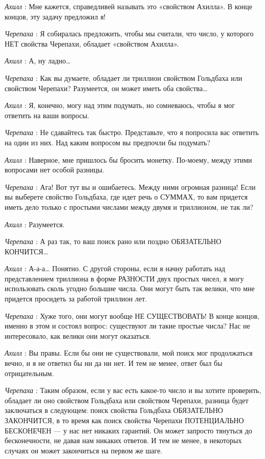 \documentclass[../main.tex]{subfiles}
\begin{document}
\begin{dialogue}
\emph{Ахилл} : Мне кажется, справедливей называть это «свойством Ахилла». В конце концов, эту задачу предложил я!

\emph{Черепаха} : Я собиралась предложить, чтобы мы считали, что число, у которого НЕТ свойства Черепахи, обладает «свойством Ахилла».

\emph{Ахилл} : А, ну ладно\ldots{}

\emph{Черепаха} : Как вы думаете, обладает ли триллион свойством Гольдбаха или свойством Черепахи? Разумеется, он может иметь оба свойства\ldots{}

\emph{Ахилл} : Я, конечно, могу над этим подумать, но сомневаюсь, чтобы я мог ответить на ваши вопросы.

\emph{Черепаха} : Не сдавайтесь так быстро. Представьте, что я попросила вас ответить на один из них. Над каким вопросом вы предпочли бы подумать?

\emph{Ахилл} : Наверное, мне пришлось бы бросить монетку. По-моему, между этими вопросами нет особой разницы.

\emph{Черепаха} : Ага! Вот тут вы и ошибаетесь. Между ними огромная разница! Если вы выберете свойство Гольдбаха, где идет речь о СУММАХ, то вам придется иметь дело только с простыми числами между двумя и триллионом, не так ли?

\emph{Ахилл} : Разумеется.

\emph{Черепаха} : А раз так, то ваш поиск рано или поздно ОБЯЗАТЕЛЬНО КОНЧИТСЯ\ldots{}

\emph{Ахилл} : А-а-а\ldots{} Понятно. С другой стороны, если я начну работать над представлением триллиона в форме РАЗНОСТИ двух простых чисел, я могу использовать сколь угодно большие числа. Они могут быть так велики, что мне придется просидеть за работой триллион лет.

\emph{Черепаха} : Хуже того, они могут вообще НЕ СУЩЕСТВОВАТЬ! В конце концов, именно в этом и состоял вопрос: существуют ли такие простые числа? Нас не интересовало, как велики они могут оказаться.

\emph{Ахилл} : Вы правы. Если бы они не существовали, мой поиск мог продолжаться вечно, и я не ответил бы ни да ни нет. И тем не менее, ответ был бы отрицательным.

\emph{Черепаха} : Таким образом, если у вас есть какое-то число и вы хотите проверить, обладает ли оно свойством Гольдбаха или свойством Черепахи, разница будет заключаться в следующем: поиск свойства Гольдбаха ОБЯЗАТЕЛЬНО ЗАКОНЧИТСЯ, в то время как поиск свойства Черепахи ПОТЕНЦИАЛЬНО БЕСКОНЕЧЕН --- у нас нет никаких гарантий. Он может запросто тянуться до бесконечности, не давая нам никаких ответов. И тем не менее, в некоторых случаях он может закончиться на первом же шаге.


\end{dialogue}
\end{document}
